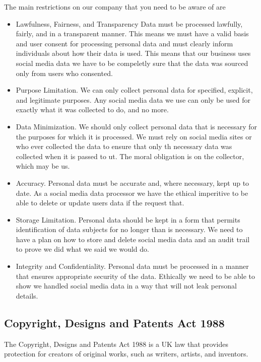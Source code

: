 \documentclass{article}
\begin{document}
\bigskip

The main restrictions on our company that you need to be aware of are
\begin{itemize}
    \item Lawfulness, Fairness, and Transparency Data must be processed lawfully, fairly, and in a transparent manner. This means we must have a valid basis and user consent for processing personal data and must clearly inform individuals about how their data is used. This means that our business uses social media data we have to be compeletly sure that the data was sourced only from users who consented.   
    \item Purpose Limitation. We can only collect personal data for specified, explicit, and legitimate purposes. Any social media data we use can only be used for exactly what it was collected to do, and no more.
    \item Data Minimization. We should only collect personal data that is necessary for the purposes for which it is processed. We must rely on social media sites or who ever collected the data to ensure that only th necessary data was collected when it is passed to ut. The moral obligation is on the collector, which may be us.
    \item Accuracy. Personal data must be accurate and, where necessary, kept up to date. As a social media data processor we have the ethical imperitive to be able to delete or update users data if the request that.
    \item Storage Limitation. Personal data should be kept in a form that permits identification of data subjects for no longer than is necessary. We need to have a plan on how to store and delete social media data and an audit trail to prove we did what we said we would do.
    \item Integrity and Confidentiality. Personal data must be processed in a manner that ensures appropriate security of the data. Ethically we need to be able to show we handled social media data in a way that will not leak personal details.
\end{itemize}


\subsection{Copyright, Designs and Patents Act 1988}
The Copyright, Designs and Patents Act 1988 is a UK law that provides protection for creators of original works, such as writers, artists, and inventors.
\end{document}
